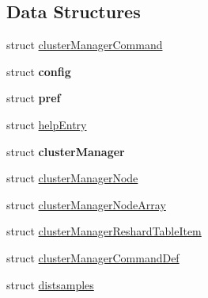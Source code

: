 \subsection*{Data Structures}
\begin{DoxyCompactItemize}
\item 
struct \hyperlink{structcluster_manager_command}{cluster\+Manager\+Command}
\item 
struct {\bfseries config}
\item 
struct {\bfseries pref}
\item 
struct \hyperlink{structhelp_entry}{help\+Entry}
\item 
struct {\bfseries cluster\+Manager}
\item 
struct \hyperlink{structcluster_manager_node}{cluster\+Manager\+Node}
\item 
struct \hyperlink{structcluster_manager_node_array}{cluster\+Manager\+Node\+Array}
\item 
struct \hyperlink{structcluster_manager_reshard_table_item}{cluster\+Manager\+Reshard\+Table\+Item}
\item 
struct \hyperlink{structcluster_manager_command_def}{cluster\+Manager\+Command\+Def}
\item 
struct \hyperlink{structdistsamples}{distsamples}
\end{DoxyCompactItemize}

